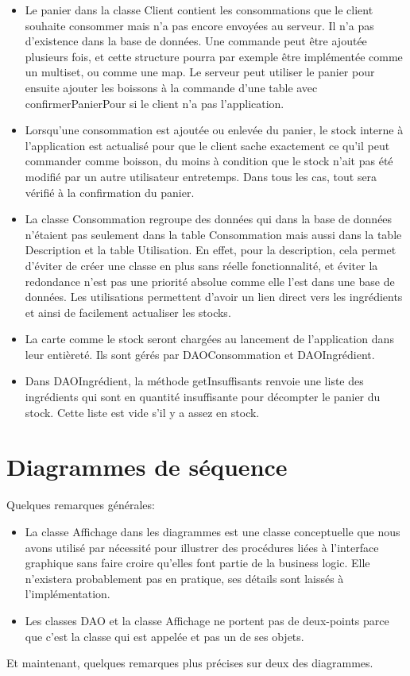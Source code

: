 \documentclass[a4paper,10pt]{article}
\begin{document}
\begin{itemize}
    \item Le panier dans la classe Client contient les consommations que le client souhaite consommer mais n'a pas encore envoyées au serveur. Il n'a pas d'existence dans la base de données. Une commande peut être ajoutée plusieurs fois, et cette structure pourra par exemple être implémentée comme un multiset, ou comme une map. Le serveur peut utiliser le panier pour ensuite ajouter les boissons à la commande d'une table avec confirmerPanierPour si le client n'a pas l'application.
    \item Lorsqu'une consommation est ajoutée ou enlevée du panier, le stock interne à l'application est actualisé pour que le client sache exactement ce qu'il peut commander comme boisson, du moins à condition que le stock n'ait pas été modifié par un autre utilisateur entretemps. Dans tous les cas, tout sera vérifié à la confirmation du panier.
    \item La classe Consommation regroupe des données qui dans la base de données n'étaient pas seulement dans la table Consommation mais aussi dans la table Description et la table Utilisation. En effet, pour la description, cela permet d'éviter de créer une classe en plus sans réelle fonctionnalité, et éviter la redondance n'est pas une priorité absolue comme elle l'est dans une base de données. Les utilisations permettent d'avoir un lien direct vers les ingrédients et ainsi de facilement actualiser les stocks.
    \item La carte comme le stock seront chargées au lancement de l'application dans leur entièreté. Ils sont gérés par DAOConsommation et DAOIngrédient.
    \item Dans DAOIngrédient, la méthode getInsuffisants renvoie une liste des ingrédients qui sont en quantité insuffisante pour décompter le panier du stock. Cette liste est vide s'il y a assez en stock.
\end{itemize}

\section{Diagrammes de séquence}

Quelques remarques générales:
\begin{itemize}
    \item La classe Affichage dans les diagrammes est une classe conceptuelle que nous avons utilisé par nécessité pour illustrer des procédures liées à l'interface graphique sans faire croire qu'elles font partie de la business logic. Elle n'existera probablement pas en pratique, ses détails sont laissés à l'implémentation.
    \item Les classes DAO et la classe Affichage ne portent pas de deux-points parce que c'est la classe qui est appelée et pas un de ses objets.
\end{itemize}
Et maintenant, quelques remarques plus précises sur deux des diagrammes.
\end{document}
